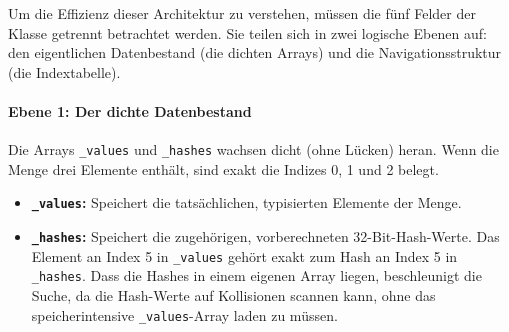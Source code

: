 Um die Effizienz dieser Architektur zu verstehen, müssen die fünf Felder der Klasse getrennt betrachtet werden. Sie teilen sich in zwei logische Ebenen auf: den eigentlichen Datenbestand (die dichten Arrays) und die Navigationsstruktur (die Indextabelle).

\paragraph{Ebene 1: Der dichte Datenbestand}
Die Arrays \texttt{_values} und \texttt{_hashes} wachsen dicht (ohne Lücken) heran. Wenn die Menge drei Elemente enthält, sind exakt die Indizes 0, 1 und 2 belegt. 
\begin{itemize}
    \item \textbf{\texttt{\_values}:} Speichert die tatsächlichen, typisierten Elemente der Menge.
    \item \textbf{\texttt{\_hashes}:} Speichert die zugehörigen, vorberechneten 32-Bit-Hash-Werte. Das Element an Index 5 in \texttt{_values} gehört exakt zum Hash an Index 5 in \texttt{_hashes}. Dass die Hashes in einem eigenen Array liegen, beschleunigt die Suche, da die  Hash-Werte auf Kollisionen scannen kann, ohne das speicherintensive \texttt{_values}-Array laden zu müssen.
\end{itemize}


